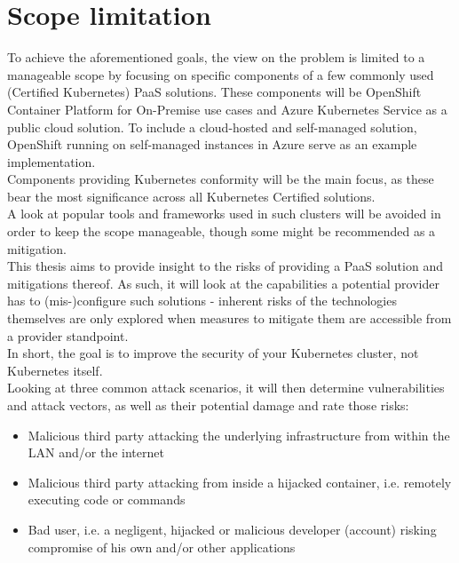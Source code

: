\section{Scope limitation}

To achieve the aforementioned goals, the view on the problem is limited to a manageable scope by
focusing on specific components of a few commonly used (Certified Kubernetes) PaaS solutions.
These components will be OpenShift Container Platform for On-Premise use cases and Azure Kubernetes Service as a public cloud solution. 
To include a cloud-hosted and self-managed solution, OpenShift running on self-managed instances in Azure serve as an
example implementation. \\
Components providing Kubernetes conformity will be the main focus, as these bear the most significance across all Kubernetes Certified solutions. \\
A look at popular tools and frameworks used in such clusters will be avoided in order to keep the scope manageable, though some might be recommended as a mitigation.\\
This thesis aims to provide insight to the risks of providing a PaaS solution and mitigations thereof. 
As such, it will look at the capabilities a potential provider has to (mis-)configure such solutions - inherent risks of the technologies themselves are only explored when measures to mitigate them are accessible from a provider standpoint. \\
In short, the goal is to improve the security of your Kubernetes cluster, not Kubernetes itself.\\
Looking at three common attack scenarios, it will then determine vulnerabilities and attack vectors,
as well as their potential damage and rate those risks:

\begin{itemize}

\item Malicious third party attacking the underlying infrastructure from within the LAN and/or the internet

\item Malicious third party attacking from inside a hijacked container, i.e. remotely executing code or commands

\item Bad user, i.e. a negligent, hijacked or malicious developer (account) risking compromise of his own and/or other applications

\end{itemize}

